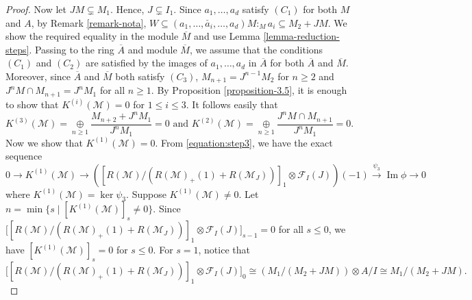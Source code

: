 \documentclass[11pt,reqno]{amsart}
\theoremstyle{definition}
\def\F{{\mathcal F}}
\def\M{{\mathcal M}}
\DeclareMathOperator{\im}{Im}
\numberwithin{equation}{section}
\begin{document}
\begin{proof}
	Now let $JM\varsubsetneq M_1.$ Hence, $J\varsubsetneq I_1.$
	Since $a_1,\ldots,a_d$ satisfy $(C_1)$ for both $M$ and $A$, by Remark \ref{remark-nota}, 
	$W\subseteq (a_1,\ldots,\check{a_i},\ldots,a_d)M:_Ma_i\subseteq M_2+JM$. We show the required equality in the module $\overline{M}$ and use Lemma \ref{lemma-reduction-steps}. Passing to the ring $\overline{A}$ and module $\overline{M}$, we assume that the conditions $(C_1)$ and $(C_2)$ are satisfied by the images of $a_1,\ldots,a_d$ in $\overline{A}$ for both $\overline{A}$ and $\overline{M}.$ Moreover, since $\overline{A}$ and $\overline{M}$ both satisfy $(C_3)$,
	$M_{n+1}=J^{n-1}M_2$ for $n\geq 2$  and $J^nM\cap M_{n+1}=J^nM_1$ for all $n\geq 1$. By Proposition \ref{proposition-3.5}, it is enough to show that $K^{(i)}(\M)=0$ for $1\leq i\leq 3$. 
	It follows easily that 
	$$K^{(3)}(\M)=\mathop\oplus\limits_{n\geq 1}\frac{M_{n+2}+J^nM_1 }{J^nM_1 }=0 \text{ and }
	K^{(2)}(\M)=\mathop\oplus\limits_{n\geq 1}\frac{J^nM\cap M_{n+1}}{ J^nM_1}=0.$$
	Now we show that $K^{(1)}(\M)=0.$ From \eqref{equation:step3},  we have the exact sequence 
	\begin{equation*}
		0\to K^{(1)}(\M)\to ([R(\M)/(R(\M)_+(1)+R(\M_J))]_1\otimes \F_I(J))(-1)\xrightarrow{\psi_3}\im \phi\to 0
	\end{equation*}
	where $K^{(1)}(\M)=\ker\psi_3$. Suppose $K^{(1)}(\M)\neq 0$. Let 
	$n=\min\{s\mid [K^{(1)}(\M)]_s\neq 0 \}.$
	Since $\big[[R(\M)/(R(\M)_+(1)+R(\M_J))]_1\otimes \F_I(J)\big]_{s-1}=0$ for all $s\leq 0$, we have $[K^{(1)}(\M)]_s=0$ for $s\leq 0.$
	For $s=1$, notice that 
	$$\big[[R(\M)/(R(\M)_+(1)+R(\M_J))]_1\otimes \F_I(J)\big]_{0}\cong (M_1/(M_2+JM))\otimes A/I\cong M_1/(M_2+JM).$$ 
	

\end{proof}
\end{document}
